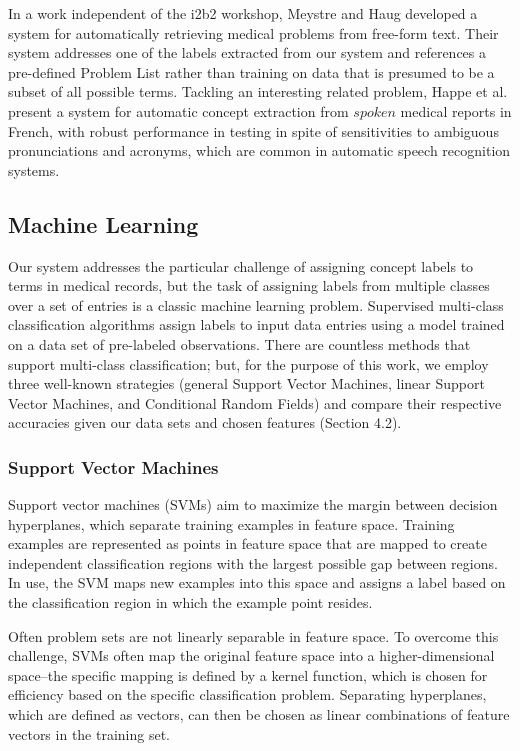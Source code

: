 \documentclass[preprint]{style}
\begin{document}
In a work independent of the i2b2 workshop, Meystre and Haug \cite{meystre} developed a system for automatically retrieving medical problems from free-form text. Their system addresses one of the labels extracted from our system and references a pre-defined Problem List rather than training on data that is presumed to be a subset of all possible terms. Tackling an interesting related problem, Happe et al. \cite{heppe} present a system for automatic concept extraction from $spoken$ medical reports in French, with robust performance in testing in spite of sensitivities to ambiguous pronunciations and acronyms, which are common in automatic speech recognition systems. 

 

\subsection{Machine Learning}

Our system addresses the particular challenge of assigning concept labels to terms in medical records, but the task of assigning labels from multiple classes over a set of entries is a classic machine learning problem. Supervised multi-class classification algorithms assign labels to input data entries using a model trained on a data set of pre-labeled observations. There are countless methods that support multi-class classification; but, for the purpose of this work, we employ three well-known strategies (general Support Vector Machines, linear Support Vector Machines, and Conditional Random Fields) and compare their respective accuracies given our data sets and chosen features (Section 4.2).

\subsubsection{Support Vector Machines}
Support vector machines (SVMs) aim to maximize the margin between decision hyperplanes, which separate training examples in feature space. Training examples are represented as points in feature space that are mapped to create independent classification regions with the largest possible gap between regions. In use, the SVM maps new examples into this space and assigns a label based on the classification region in which the example point resides. 

Often problem sets are not linearly separable in feature space. To overcome this challenge, SVMs often map the original feature space into a higher-dimensional space--the specific mapping is defined by a kernel function, which is chosen for efficiency based on the specific classification problem. Separating hyperplanes, which are defined as vectors, can then be chosen as linear combinations of feature vectors in the training set.
\end{document}
